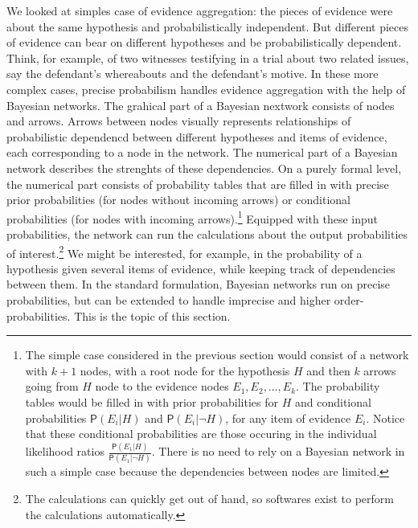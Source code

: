 \documentclass[
  letterpaper,
  DIV=11,
  numbers=noendperiod]{scrartcl}
\newcommand{\pr}[1]{\mathsf{P}(#1)}
\begin{document}
We looked at simples case of evidence aggregation: the pieces of
evidence were about the same hypothesis and probabilistically
independent. But different pieces of evidence can bear on different
hypotheses and be probabilistically dependent. Think, for example, of
two witnesses testifying in a trial about two related issues, say the
defendant's whereabouts and the defendant's motive. In these more
complex cases, precise probabilism handles evidence aggregation with the
help of Bayesian networks. The grahical part of a Bayesian nextwork
consists of nodes and arrows. Arrows between nodes visually represents
relationships of probabilistic dependencd between different hypotheses
and items of evidence, each corresponding to a node in the network. The
numerical part of a Bayesian network describes the strenghts of these
dependencies. On a purely formal level, the numerical part consists of
probability tables that are filled in with precise prior probabilities
(for nodes without incoming arrows) or conditional probabilities (for
nodes with incoming arrows).\footnote{The simple case considered in the
  previous section would consist of a network with \(k+1\) nodes, with a
  root node for the hypothesis \(H\) and then \(k\) arrows going from
  \(H\) node to the evidence nodes \(E_1, E_2, \dots, E_k\). The
  probability tables would be filled in with prior probabilities for
  \(H\) and conditional probabilities \(\pr{E_i \vert H}\) and
  \(\pr{E_i \vert \neg H}\), for any item of evidence \(E_i\). Notice
  that these conditional probabilities are those occuring in the
  individual likelihood ratios
  \(\frac{\pr{E_1 \vert H}}{\pr{E_1\vert \neg H}}\). There is no need to
  rely on a Bayesian network in such a simple case because the
  dependencies between nodes are limited.} Equipped with these input
probabilities, the network can run the calculations about the output
probabilities of interest.\footnote{The calculations can quickly get out
  of hand, so softwares exist to perform the calculations automatically.}
We might be interested, for example, in the probability of a hypothesis
given several items of evidence, while keeping track of dependencies
between them. In the standard formulation, Bayesian networks run on
precise probabilities, but can be extended to handle imprecise and
higher order-probabilities. This is the topic of this section.
\end{document}
